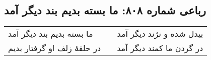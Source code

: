 \begin{center}
\section*{رباعی شماره ۸۰۸: ما بسته بدیم بند دیگر آمد}
\label{sec:0808}
\begin{longtable}{l p{0.5cm} r}
ما بسته بدیم بند دیگر آمد
&&
بیدل شده و نژند دیگر آمد
\\
در حلقهٔ زلف او گرفتار بدیم
&&
در گردن ما کمند دیگر آمد
\\
\end{longtable}
\end{center}
